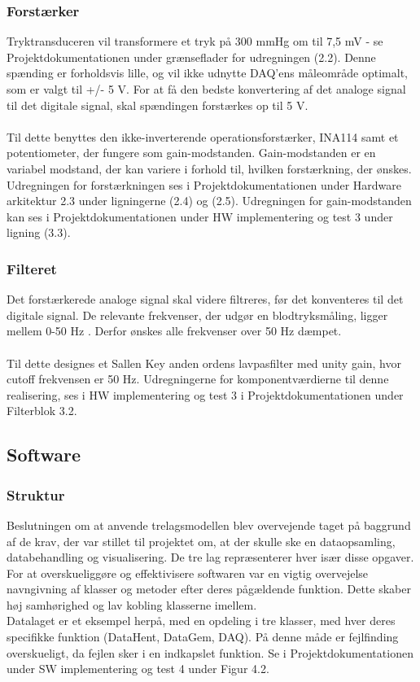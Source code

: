 \subsubsection{Forstærker}
Tryktransduceren vil transformere et tryk på 300 mmHg om til 7,5 mV - se Projektdokumentationen under grænseflader for udregningen (2.2). Denne spænding er forholdsvis lille, og vil ikke udnytte DAQ'ens måleområde optimalt, som er valgt til +/- 5 V. For at få den bedste konvertering af det analoge signal til det digitale signal, skal spændingen forstærkes op til 5 V. 
\\\\
Til dette benyttes den ikke-inverterende operationsforstærker, INA114 samt et potentiometer, der fungere som gain-modstanden. Gain-modstanden er en variabel modstand, der kan variere i forhold til, hvilken forstærkning, der ønskes. Udregningen for forstærkningen ses i Projektdokumentationen under Hardware arkitektur 2.3 under ligningerne (2.4) og (2.5). Udregningen for gain-modstanden kan ses i Projektdokumentationen under HW implementering og test 3 under ligning (3.3).     

\subsubsection{Filteret}
Det forstærkerede analoge signal skal videre filtreres, før det konventeres til det digitale signal. De relevante frekvenser, der udgør en blodtryksmåling, ligger mellem 0-50 Hz \cite[s. 10]{Billed for invasiv blodtryksmaling}. Derfor ønskes alle frekvenser over 50 Hz dæmpet.
\\\\
Til dette designes et Sallen Key anden ordens lavpasfilter med unity gain, hvor cutoff frekvensen er 50 Hz. Udregningerne for komponentværdierne til denne realisering, ses i HW implementering og test 3 i Projektdokumentationen under Filterblok 3.2.

\subsection{Software}
 
\subsubsection{Struktur}
Beslutningen om at anvende trelagsmodellen blev overvejende taget på baggrund af de krav, der var stillet til projektet om, at der skulle ske en dataopsamling, databehandling og visualisering. De tre lag repræsenterer hver især disse opgaver. 
For at overskueliggøre og effektivisere softwaren var en vigtig overvejelse navngivning af klasser og metoder efter deres pågældende funktion. Dette skaber høj samhørighed og lav kobling klasserne imellem.\\
Datalaget er et eksempel herpå, med en opdeling i tre klasser, med hver deres specifikke funktion (DataHent, DataGem, DAQ). På denne måde er fejlfinding overskueligt, da fejlen sker i en indkapslet funktion. Se i Projektdokumentationen under SW implementering og test 4 under Figur 4.2.

